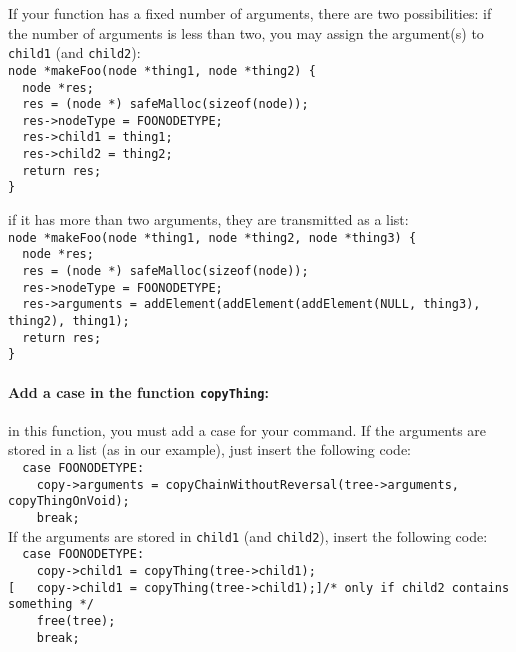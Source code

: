 \documentclass{article}
\newcommand{\commandMakeFunc}{\texttt{makeFoo}}
\newcommand{\commandNodeName}{\texttt{FOONODETYPE}\xspace}
\begin{document}
If your function has a fixed number of arguments, there are two possibilities: if the number of arguments is less than two, you may assign the argument(s) to \texttt{child1} (and \texttt{child2}):\\
\texttt{node *}\commandMakeFunc\texttt{(node *thing1, node *thing2) \{}\\
\phantom{1}\texttt{~~node *res;}\\
\phantom{1}\texttt{~~res = (node *) safeMalloc(sizeof(node));}\\
\phantom{1}\texttt{~~res->nodeType = }\commandNodeName\texttt{;}\\
\phantom{1}\texttt{~~res->child1 = thing1;}\\
\phantom{1}\texttt{~~res->child2 = thing2;}\\
\phantom{1}\texttt{~~return res;}\\
\texttt{\}}

if it has more than two arguments, they are transmitted as a list:\\
\texttt{node *}\commandMakeFunc\texttt{(node *thing1, node *thing2, node *thing3) \{}\\
\phantom{1}\texttt{~~node *res;}\\
\phantom{1}\texttt{~~res = (node *) safeMalloc(sizeof(node));}\\
\phantom{1}\texttt{~~res->nodeType = }\commandNodeName\texttt{;}\\
\phantom{1}\texttt{~~res->arguments = addElement(addElement(addElement(NULL, thing3), thing2), thing1);}\\
\phantom{1}\texttt{~~return res;}\\
\texttt{\}}

\paragraph{Add a case in the function \texttt{copyThing}: } in this function, you must add a case for your command. If the arguments are stored in a list (as in our example), just insert the following code:\\
\phantom{1}\texttt{~~case }\commandNodeName\texttt{:}\\
\phantom{1}\texttt{~~~~copy->arguments = copyChainWithoutReversal(tree->arguments, copyThingOnVoid);}\\
\phantom{1}\texttt{~~~~break;}\\
If the arguments are stored in \texttt{child1} (and \texttt{child2}), insert the following code:\\
\phantom{1}\texttt{~~case }\commandNodeName\texttt{:}\\
\phantom{1}\texttt{~~~~copy->child1 = copyThing(tree->child1);}\\
\phantom{1}\texttt{[~~~copy->child1 = copyThing(tree->child1);]\qquad /* only if child2 contains something */}\\
\phantom{1}\texttt{~~~~free(tree);}\\
\phantom{1}\texttt{~~~~break;}\\
\end{document}
